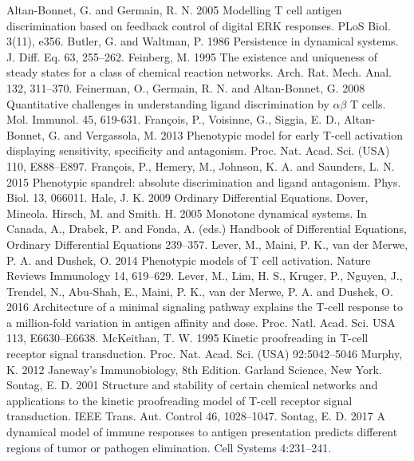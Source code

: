 \documentclass{article}
\begin{document}
\begin{thebibliography}{12}
 Altan-Bonnet, G. and Germain, R. N. 2005 Modelling
T cell antigen discrimination based on feedback control of digital ERK 
responses. PLoS Biol. 3(11), e356. 
 Butler, G. and Waltman, P. 1986 Persistence in dynamical
systems. J. Diff. Eq. 63, 255--262.
 Feinberg, M. 1995 The existence and uniqueness of steady
states for a class of chemical reaction networks. Arch. Rat. Mech. Anal. 132,
311--370.
 Feinerman, O., Germain, R. N. and Altan-Bonnet, G. 2008 
Quantitative challenges in understanding ligand discrimination by $\alpha\beta$
T cells. Mol. Immunol. 45, 619-631.
 Fran\c{c}ois, P., Voisinne, G., Siggia, E. D., 
Altan-Bonnet, G. and Vergassola, M. 2013 Phenotypic model for early T-cell 
activation displaying sensitivity, specificity and antagonism. Proc. Nat. 
Acad. Sci. (USA) 110, E888--E897.
 Fran\c{c}ois, P., Hemery, M., Johnson, K. A. and 
Saunders, L. N. 2015 Phenotypic spandrel: absolute discrimination and ligand 
antagonism. Phys. Biol. 13, 066011.
 Hale, J. K. 2009 Ordinary Differential Equations. Dover, 
Mineola.
 Hirsch, M. and Smith. H. 2005 Monotone dynamical systems.
In Canada, A., Drabek, P. and Fonda, A. (eds.) Handbook of Differential
Equations, Ordinary Differential Equations 239--357.
 Lever, M., Maini, P. K., van der Merwe, P. A. and 
Dushek, O. 2014 Phenotypic models of T cell activation. Nature Reviews 
Immunology 14, 619--629.
 Lever, M., Lim, H. S., Kruger, P., Nguyen, J., Trendel, N.,
Abu-Shah, E., Maini, P. K., van der Merwe, P. A. and Dushek, O. 2016 
Architecture of a minimal signaling pathway explains the T-cell response
to a million-fold variation in antigen affinity and dose. Proc. Natl. Acad.
Sci. USA 113, E6630--E6638.
 McKeithan, T. W. 1995 Kinetic proofreading in T-cell 
receptor signal transduction. Proc. Nat. Acad. Sci. (USA) 92:5042--5046
 Murphy, K. 2012 Janeway's Immunobiology, 8th Edition.
Garland Science, New York.
 Sontag, E. D. 2001 Structure and stability of certain 
chemical networks and applications to the kinetic proofreading model of T-cell
receptor signal transduction. IEEE Trans. Aut. Control 46, 1028--1047.
 Sontag, E. D. 2017 A dynamical model of immune responses to
antigen presentation predicts different regions of tumor or pathogen 
elimination. Cell Systems 4:231--241.

\end{thebibliography}
\end{document}
